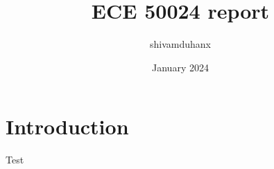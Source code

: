 \documentclass{article}
\title{ECE 50024 report}
\author{shivamduhanx }
\date{January 2024}
\begin{document}
\maketitle

\section{Introduction}
Test
\end{document}
